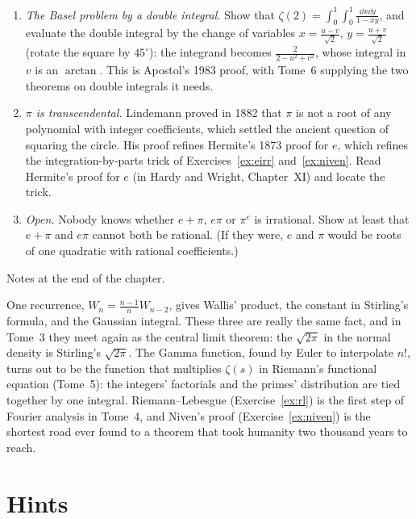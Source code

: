 \begin{challenge}
\begin{enumerate}[label=(\arabic*)]
\item \emph{The Basel problem by a double integral.} Show that $\zeta(2)=\int_0^1\!\!\int_0^1\frac{\dd x\dd y}{1-xy}$, and evaluate the double integral by the change of variables $x=\frac{u-v}{\sqrt2}$, $y=\frac{u+v}{\sqrt2}$ (rotate the square by $45^\circ$): the integrand becomes $\frac2{2-u^2+v^2}$, whose integral in $v$ is an $\arctan$. This is Apostol's 1983 proof, with Tome~6 supplying the two theorems on double integrals it needs.
\item \emph{$\pi$ is transcendental.} Lindemann proved in 1882 that $\pi$ is not a root of any polynomial with integer coefficients, which settled the ancient question of squaring the circle. His proof refines Hermite's 1873 proof for $e$, which refines the integration-by-parts trick of Exercises~\ref{ex:eirr} and~\ref{ex:niven}. Read Hermite's proof for $e$ (in Hardy and Wright, Chapter~XI) and locate the trick.
\item \emph{Open.} Nobody knows whether $e+\pi$, $e\pi$ or $\pi^e$ is irrational. Show at least that $e+\pi$ and $e\pi$ cannot both be rational. (If they were, $e$ and $\pi$ would be roots of one quadratic with rational coefficients.)
\end{enumerate}
Notes at the end of the chapter.
\end{challenge}

\begin{beauty}
One recurrence, $W_n=\frac{n-1}nW_{n-2}$, gives Wallis' product, the constant in Stirling's formula, and the Gaussian integral. These three
are really the same fact, and in Tome~3 they meet again as the central limit theorem: the $\sqrt{2\pi}$ in the normal density is Stirling's
$\sqrt{2\pi}$. The Gamma function, found by Euler to interpolate $n!$, turns out to be the function that multiplies $\zeta(s)$ in Riemann's
functional equation (Tome~5): the integers' factorials and the primes' distribution are tied together by one integral. Riemann--Lebesgue
(Exercise~\ref{ex:rl}) is the first step of Fourier analysis in Tome~4, and Niven's proof (Exercise~\ref{ex:niven}) is the shortest road ever
found to a theorem that took humanity two thousand years to reach.
\end{beauty}

\section{Hints}

